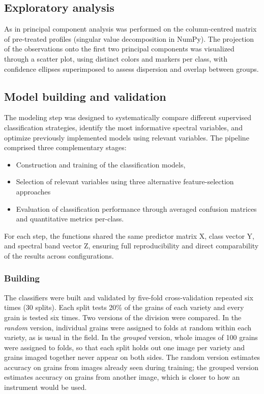 \documentclass[final,5p,times,twocolumn]{elsarticle}
\newcommand{\added}[1]{{\color{blue}#1}}
\begin{document}
\subsection{Exploratory analysis}

As in \citet{amigo2013,zhang2022,ali2024} principal component analysis was performed on the column-centred matrix of pre-treated profiles \added{(singular value decomposition in NumPy)}.
The projection of the observations onto the first two principal components was visualized through a scatter plot, using distinct colors and markers per class, with confidence ellipses superimposed to assess dispersion and overlap between groups. 

\subsection{Model building and validation}

The modeling step was designed to systematically compare different supervised classification strategies, identify the most informative spectral variables, and optimize previously implemented models using relevant variables. 
The pipeline comprised three complementary stages: 
\begin{itemize}
    \item [i] Construction and training of the classification models, 
    \item [ii] Selection of relevant variables using three alternative feature-selection approaches 
    \item [iii] Evaluation of classification performance through averaged confusion matrices and quantitative metrics per-class. 
\end{itemize}

For each step, the functions shared the same predictor matrix X, class vector Y, and  spectral band vector Z, ensuring full reproducibility and direct comparability of the results across configurations.


\subsubsection{Building}\label{sec_building}

The classifiers were built and validated by five-fold cross-validation repeated six times (30 splits). Each split tests 20\% of the grains of each variety and every grain is tested six times. Two versions of the division were compared. In the \emph{random} version, individual grains were assigned to folds at random within each variety, as is usual in the field. In the \emph{grouped} version, whole images of 100 grains were assigned to folds, so that each split holds out one image per variety and grains imaged together never appear on both sides. The random version estimates accuracy on grains from images already seen during training; the grouped version estimates accuracy on grains from another image, which is closer to how an instrument would be used.
\end{document}
